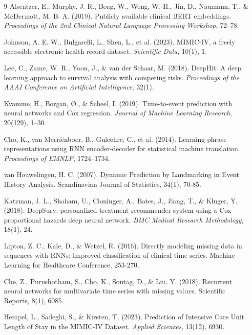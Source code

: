 \documentclass[10pt, a4paper]{article}
\begin{document}
\begin{thebibliography}{9}
Alsentzer, E., Murphy, J. R., Boag, W., Weng, W.-H., Jin, D., Naumann, T., \& McDermott, M. B. A. (2019).
Publicly available clinical BERT embeddings.
\textit{Proceedings of the 2nd Clinical Natural Language Processing Workshop}, 72--78.

Johnson, A. E. W., Bulgarelli, L., Shen, L., et al. (2023).
MIMIC-IV, a freely accessible electronic health record dataset.
\textit{Scientific Data}, 10(1), 1.

Lee, C., Zame, W. R., Yoon, J., \& van der Schaar, M. (2018).
DeepHit: A deep learning approach to survival analysis with competing risks.
\textit{Proceedings of the AAAI Conference on Artificial Intelligence}, 32(1).

Kvamme, H., Borgan, {\O}., \& Scheel, I. (2019).
Time-to-event prediction with neural networks and Cox regression.
\textit{Journal of Machine Learning Research}, 20(129), 1--30.

Cho, K., van Merri\"{e}nboer, B., Gulcehre, C., et al. (2014).
Learning phrase representations using RNN encoder-decoder for statistical machine translation.
\textit{Proceedings of EMNLP}, 1724--1734.

van Houwelingen, H. C. (2007). Dynamic Prediction by Landmarking in Event History Analysis. Scandinavian Journal of Statistics, 34(1), 70-85.

Katzman, J. L., Shaham, U., Cloninger, A., Bates, J., Jiang, T., \& Kluger, Y. (2018).
DeepSurv: personalized treatment recommender system using a Cox proportional hazards deep neural network.
\textit{BMC Medical Research Methodology}, 18(1), 24.

Lipton, Z. C., Kale, D., \& Wetzel, R. (2016). Directly modeling missing data in sequences with RNNs: Improved classification of clinical time series. Machine Learning for Healthcare Conference, 253-270.

Che, Z., Purushotham, S., Cho, K., Sontag, D., \& Liu, Y. (2018). Recurrent neural networks for multivariate time series with missing values. Scientific Reports, 8(1), 6085.

Hempel, L., Sadeghi, S., \& Kirsten, T. (2023).
Prediction of Intensive Care Unit Length of Stay in the MIMIC-IV Dataset.
\textit{Applied Sciences}, 13(12), 6930.

\end{thebibliography}
\end{document}
